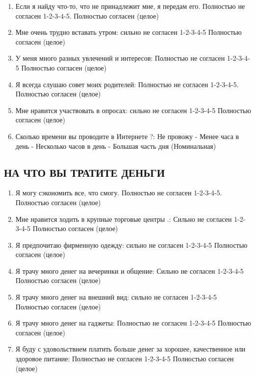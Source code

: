 \documentclass[11pt]{article}
\begin{document}
\begin{enumerate}
\item Если я найду что-то, что не принадлежит мне, я передам его. Полностью не согласен 1-2-3-4-5. Полностью согласен (целое)
\item Мне очень трудно вставать утром: сильно не согласен 1-2-3-4-5 Полностью согласен (целое)
\item У меня много разных увлечений и интересов: Полностью не согласен 1-2-3-4-5 Полностью согласен (целое)
\item Я всегда слушаю совет моих родителей: Полностью не согласен 1-2-3-4-5. Полностью согласен (целое)
\item Мне нравится участвовать в опросах: сильно не согласен 1-2-3-4-5 Полностью согласен (целое)
\item Сколько времени вы проводите в Интернете ?: Не провожу - Менее часа в день - Несколько часов в день - Большая часть дня (Номинальная)
\end{enumerate}
\subsection{НА ЧТО ВЫ ТРАТИТЕ ДЕНЬГИ}
\begin{enumerate}
\item Я могу сэкономить все, что смогу. Полностью не согласен 1-2-3-4-5. Полностью согласен (целое)
\item Мне нравится ходить в крупные торговые центры .: Сильно не согласен 1-2-3-4-5 Полностью согласен (целое)
\item Я предпочитаю фирменную одежду: сильно не согласен 1-2-3-4-5 Полностью согласен (целое)
\item Я трачу много денег на вечеринки и общение: Сильно не согласен 1-2-3-4-5 Полностью согласен (целое)
\item Я трачу много денег на внешний вид: сильно не согласен 1-2-3-4-5 Полностью согласен (целое)
\item Я трачу много денег на гаджеты: Полностью не согласен 1-2-3-4-5 Полностью согласен (целое)
\item Я буду с удовольствием  платить больше денег за хорошее, качественное или здоровое питание: Полностью не согласен 1-2-3-4-5 Полностью согласен (целое)
\end{enumerate}
\end{document}
